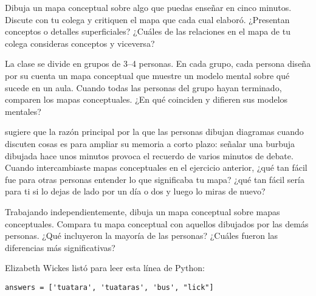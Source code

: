 

Dibuja un mapa conceptual sobre algo que puedas enseñar en cinco minutos.
Discute con tu colega y critiquen el mapa que cada cual elaboró.
¿Presentan conceptos o detalles superficiales?
¿Cuáles de las relaciones en el mapa de tu colega consideras conceptos y viceversa?


La clase se divide en grupos de 3--4 personas.
En cada grupo, cada persona diseña por su cuenta un mapa conceptual que muestre un modelo mental sobre qué sucede en un aula.
Cuando todas las personas del grupo hayan terminado,
comparen los mapas conceptuales.
¿En qué coinciden y difieren sus modelos mentales?


\cite{Cher2007} sugiere que
la razón principal por la que las personas dibujan diagramas cuando discuten cosas
es para ampliar su memoria a corto plazo:
señalar una burbuja dibujada hace unos minutos provoca el recuerdo de varios minutos de debate.
Cuando intercambiaste mapas conceptuales en el ejercicio anterior,
¿qué tan fácil fue para otras personas entender lo que significaba tu mapa?
¿qué tan fácil sería para ti si lo dejas de lado por un día o dos y luego lo miras de nuevo?


Trabajando independientemente,
dibuja un mapa conceptual sobre mapas conceptuales.
Compara tu mapa conceptual con aquellos dibujados por las demás personas.
¿Qué incluyeron la mayoría de las personas?
¿Cuáles fueron las diferencias más significativas?


Elizabeth Wickes listó
para leer esta línea de Python:

\begin{verbatim}
answers = ['tuatara', 'tuataras', 'bus', "lick"]
\end{verbatim}

